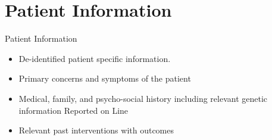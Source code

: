 \section{Patient Information}

\begin{frame}{Patient Information}
    \begin{itemize}
        \item De-identified patient specific information.
        \item Primary concerns and symptoms of the patient
        \item Medical, family, and psycho-social history including relevant genetic information Reported on Line
        \item Relevant past interventions with outcomes
    
    \end{itemize}
\end{frame}
